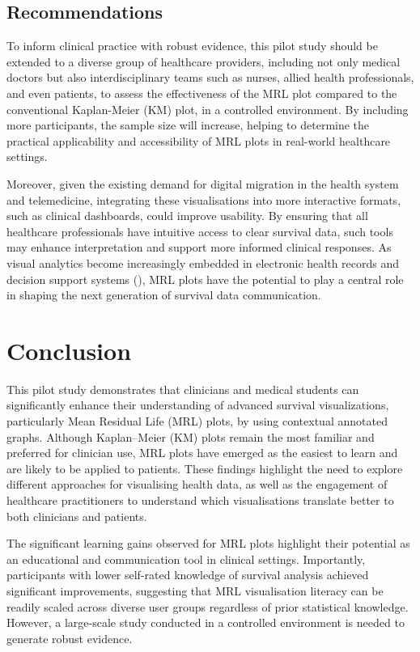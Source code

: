 \documentclass[
  onecolumn]{article}
\begin{document}
\subsection{Recommendations}\label{recommendations}

To inform clinical practice with robust evidence, this pilot study
should be extended to a diverse group of healthcare providers, including
not only medical doctors but also interdisciplinary teams such as
nurses, allied health professionals, and even patients, to assess the
effectiveness of the MRL plot compared to the conventional Kaplan-Meier
(KM) plot, in a controlled environment. By including more participants,
the sample size will increase, helping to determine the practical
applicability and accessibility of MRL plots in real-world healthcare
settings.

Moreover, given the existing demand for digital migration in the health
system and telemedicine, integrating these visualisations into more
interactive formats, such as clinical dashboards, could improve
usability. By ensuring that all healthcare professionals have intuitive
access to clear survival data, such tools may enhance interpretation and
support more informed clinical responses. As visual analytics become
increasingly embedded in electronic health records and decision support
systems (\citet{rostamzadehVisualAnalyticsElectronic2021}), MRL plots
have the potential to play a central role in shaping the next generation
of survival data communication.

\section{Conclusion}\label{conclusion}

This pilot study demonstrates that clinicians and medical students can
significantly enhance their understanding of advanced survival
visualizations, particularly Mean Residual Life (MRL) plots, by using
contextual annotated graphs. Although Kaplan--Meier (KM) plots remain
the most familiar and preferred for clinician use, MRL plots have
emerged as the easiest to learn and are likely to be applied to
patients. These findings highlight the need to explore different
approaches for visualising health data, as well as the engagement of
healthcare practitioners to understand which visualisations translate
better to both clinicians and patients.

The significant learning gains observed for MRL plots highlight their
potential as an educational and communication tool in clinical settings.
Importantly, participants with lower self-rated knowledge of survival
analysis achieved significant improvements, suggesting that MRL
visualisation literacy can be readily scaled across diverse user groups
regardless of prior statistical knowledge. However, a large-scale study
conducted in a controlled environment is needed to generate robust
evidence.
\end{document}
